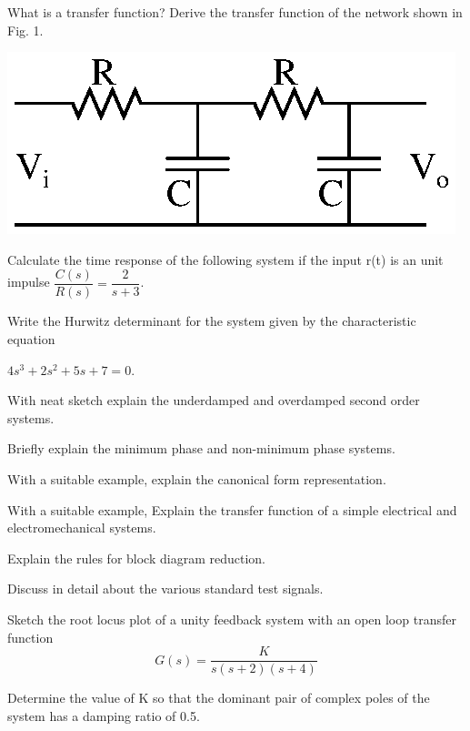 \markA
\partB

\item What is a transfer function? Derive the transfer function of the network shown
  in Fig. 1.

\begin{center}
\includegraphics{src/s5/ai/09_503/fig001}
\end{center}
\item Calculate the time response of the following system if the input r(t) is an unit
  impulse $ \dfrac{C(s)}{R(s)} = \dfrac{2}{s+3}$.
\item Write the Hurwitz determinant for the system given by the characteristic equation

  $4s^3 + 2s^2 + 5s + 7 = 0$.
\item With neat sketch explain the underdamped and overdamped second order systems.
\item Briefly explain the minimum phase and non-minimum phase systems.

\newpage \again

\item With a suitable example, explain the canonical form representation.

\markB
\partC

\item \iitem With a suitable example, Explain the transfer function of a simple electrical
  and electromechanical systems.
\Or
\item Explain the rules for block diagram reduction.
\ene

\item \iitem Discuss in detail about the various standard test signals.
\Or
\item Sketch the root locus plot of a unity feedback system with an open loop transfer
  function
  \[ G(s) = \frac{K}{s (s + 2) (s + 4)} \]

  Determine the value of K so that the dominant pair of complex poles of the system has a damping
  ratio of 0.5.
\ene

